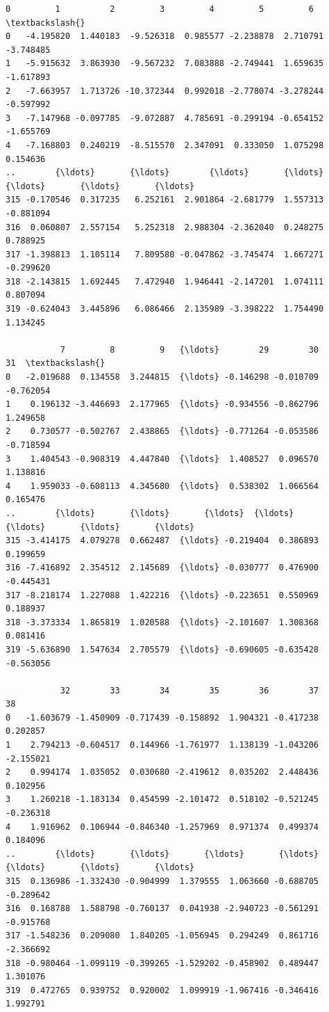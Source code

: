 \documentclass[11pt]{article}
\makeatletter
\newcommand{\boxspacing}{\kern\kvtcb@left@rule\kern\kvtcb@boxsep}
\newcommand{\prompt}[4]{
        {\ttfamily\llap{{\color{#2}[#3]:\hspace{3pt}#4}}\vspace{-\baselineskip}}
    }
\makeatother
\begin{document}
            \begin{tcolorbox}[breakable, size=fbox, boxrule=.5pt, pad at break*=1mm, opacityfill=0]
\prompt{Out}{outcolor}{131}{\boxspacing}
\begin{Verbatim}[commandchars=\\\{\}]
           0         1          2         3         4         5         6   \textbackslash{}
0   -4.195820  1.440183  -9.526318  0.985577 -2.238878  2.710791 -3.748485
1   -5.915632  3.863930  -9.567232  7.083888 -2.749441  1.659635 -1.617893
2   -7.663957  1.713726 -10.372344  0.992018 -2.778074 -3.278244 -0.597992
3   -7.147968 -0.097785  -9.072887  4.785691 -0.299194 -0.654152 -1.655769
4   -7.168803  0.240219  -8.515570  2.347091  0.333050  1.075298  0.154636
..        {\ldots}       {\ldots}        {\ldots}       {\ldots}       {\ldots}       {\ldots}       {\ldots}
315 -0.170546  0.317235   6.252161  2.901864 -2.681779  1.557313 -0.881094
316  0.060807  2.557154   5.252318  2.988304 -2.362040  0.248275  0.788925
317 -1.398813  1.105114   7.809580 -0.047862 -3.745474  1.667271 -0.299620
318 -2.143815  1.692445   7.472940  1.946441 -2.147201  1.074111  0.807094
319 -0.624043  3.445896   6.086466  2.135989 -3.398222  1.754490  1.134245

           7         8         9   {\ldots}        29        30        31  \textbackslash{}
0   -2.019688  0.134558  3.244815  {\ldots} -0.146298 -0.010709 -0.762054
1    0.196132 -3.446693  2.177965  {\ldots} -0.934556 -0.862796  1.249658
2    0.730577 -0.502767  2.438865  {\ldots} -0.771264 -0.053586 -0.718594
3    1.404543 -0.908319  4.447840  {\ldots}  1.408527  0.096570  1.138816
4    1.959033 -0.608113  4.345680  {\ldots}  0.538302  1.066564  0.165476
..        {\ldots}       {\ldots}       {\ldots}  {\ldots}       {\ldots}       {\ldots}       {\ldots}
315 -3.414175  4.079278  0.662487  {\ldots} -0.219404  0.386893  0.199659
316 -7.416892  2.354512  2.145689  {\ldots} -0.030777  0.476900 -0.445431
317 -8.218174  1.227088  1.422216  {\ldots} -0.223651  0.550969  0.188937
318 -3.373334  1.865819  1.020588  {\ldots} -2.101607  1.308368  0.081416
319 -5.636890  1.547634  2.705579  {\ldots} -0.690605 -0.635428 -0.563056

           32        33        34        35        36        37        38
0   -1.603679 -1.450909 -0.717439 -0.158892  1.904321 -0.417238  0.202857
1    2.794213 -0.604517  0.144966 -1.761977  1.138139 -1.043206 -2.155021
2    0.994174  1.035052  0.030680 -2.419612  0.035202  2.448436  0.102956
3    1.260218 -1.183134  0.454599 -2.101472  0.518102 -0.521245 -0.236318
4    1.916962  0.106944 -0.846340 -1.257969  0.971374  0.499374  0.184096
..        {\ldots}       {\ldots}       {\ldots}       {\ldots}       {\ldots}       {\ldots}       {\ldots}
315  0.136986 -1.332430 -0.904999  1.379555  1.063660 -0.688705 -0.289642
316  0.168788  1.588798 -0.760137  0.041938 -2.940723 -0.561291 -0.915768
317 -1.548236  0.209080  1.840205 -1.056945  0.294249  0.861716 -2.366692
318 -0.980464 -1.099119 -0.399265 -1.529202 -0.458902  0.489447  1.301076
319  0.472765  0.939752  0.920002  1.099919 -1.967416 -0.346416  1.992791


\end{Verbatim}
\end{tcolorbox}
\end{document}
